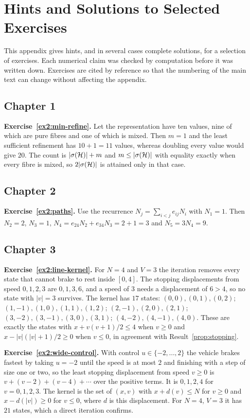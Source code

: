 \chapter{Hints and Solutions to Selected Exercises}\label{app:hints2}

This appendix gives hints, and in several cases complete solutions, for a selection of exercises. Each numerical claim was checked by computation before it was written down. Exercises are cited by reference so that the numbering of the main text can change without affecting the appendix.

\section*{Chapter 1}

\textbf{Exercise~\ref{ex2:min-refine}.} Let the representation have ten values, nine of which are pure fibres and one of which is mixed. Then $m=1$ and the least sufficient refinement has $10+1=11$ values, whereas doubling every value would give $20$. The count is $|\sigma(\mathcal{H})|+m$ and $m\le|\sigma(\mathcal{H})|$ with equality exactly when every fibre is mixed, so $2|\sigma(\mathcal{H})|$ is attained only in that case.

\section*{Chapter 2}

\textbf{Exercise~\ref{ex2:paths}.} Use the recurrence $N_j=\sum_{i<j}e_{ij}N_i$ with $N_1=1$. Then $N_2=2$, $N_3=1$, $N_4=e_{24}N_2+e_{34}N_3=2+1=3$ and $N_5=3N_4=9$.

\section*{Chapter 3}

\textbf{Exercise~\ref{ex2:line-kernel}.} For $N=4$ and $V=3$ the iteration removes every state that cannot brake to rest inside $[0,4]$. The stopping displacements from speed $0,1,2,3$ are $0,1,3,6$, and a speed of $3$ needs a displacement of $6>4$, so no state with $|v|=3$ survives. The kernel has $17$ states: $(0,0),(0,1),(0,2)$; $(1,-1),(1,0),(1,1),(1,2)$; $(2,-1),(2,0),(2,1)$; $(3,-2),(3,-1),(3,0),(3,1)$; $(4,-2),(4,-1),(4,0)$. These are exactly the states with $x+v(v+1)/2\le4$ when $v\ge0$ and $x-|v|(|v|+1)/2\ge0$ when $v\le0$, in agreement with Result~\ref{prop:stopping}.

\textbf{Exercise~\ref{ex2:wide-control}.} With control $u\in\{-2,\dots,2\}$ the vehicle brakes fastest by taking $u=-2$ until the speed is at most $2$ and finishing with a step of size one or two, so the least stopping displacement from speed $v\ge0$ is $v+(v-2)+(v-4)+\cdots$ over the positive terms. It is $0,1,2,4$ for $v=0,1,2,3$. The kernel is the set of $(x,v)$ with $x+d(v)\le N$ for $v\ge0$ and $x-d(|v|)\ge0$ for $v\le0$, where $d$ is this displacement. For $N=4$, $V=3$ it has $21$ states, which a direct iteration confirms.

